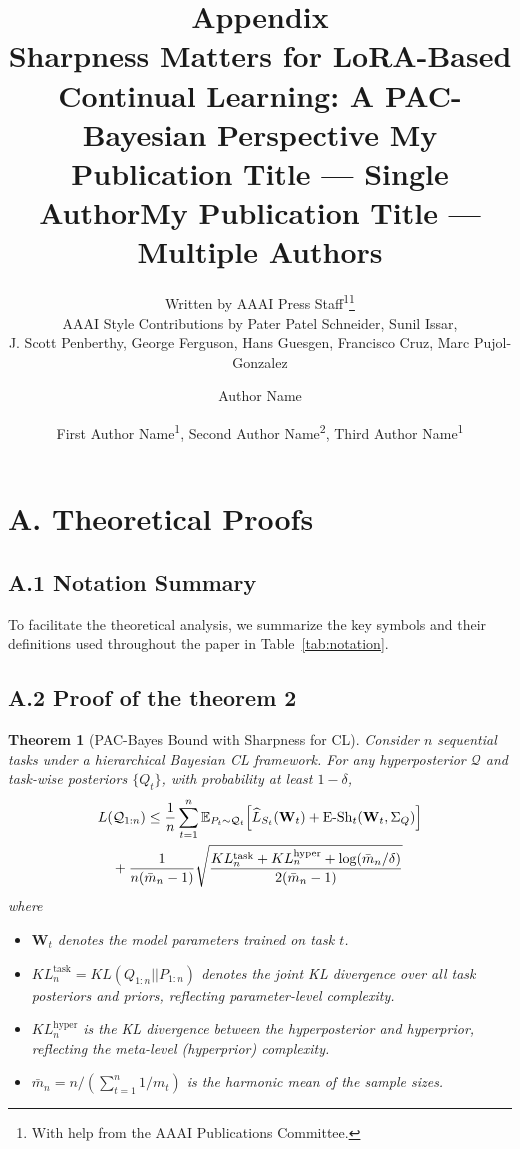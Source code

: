 \documentclass[letterpaper]{article} %
\title{Appendix \\ Sharpness Matters for LoRA-Based Continual Learning: A PAC-Bayesian Perspective }
\author{
    Written by AAAI Press Staff\textsuperscript{\rm 1}\thanks{With help from the AAAI Publications Committee.}\\
    AAAI Style Contributions by Pater Patel Schneider,
    Sunil Issar,\\
    J. Scott Penberthy,
    George Ferguson,
    Hans Guesgen,
    Francisco Cruz\equalcontrib,
    Marc Pujol-Gonzalez\equalcontrib
}
\title{My Publication Title --- Single Author}
\author {
    Author Name
}
\title{My Publication Title --- Multiple Authors}
\author {
    First Author Name\textsuperscript{\rm 1},
    Second Author Name\textsuperscript{\rm 2},
    Third Author Name\textsuperscript{\rm 1}
}
\newtheorem{theorem}{Theorem}
\begin{document}
\maketitle




\section{A. Theoretical Proofs}







\subsection{A.1 Notation Summary}
To facilitate the theoretical analysis, we summarize the key symbols and their definitions used throughout the paper in Table~\ref{tab:notation}.







\subsection{A.2 Proof of the theorem 2}

\begin{theorem}[PAC-Bayes Bound with Sharpness for CL]
\label{thm:general-pacbayes}
Consider $n$ sequential tasks under a hierarchical Bayesian CL framework. For any hyperposterior $\mathcal{Q}$ and task-wise posteriors $\{Q_t\}$, with probability at least $1-\delta$,
\begin{align}
& L(\mathcal{Q}_{1:n}) \leq \frac{1}{n} \sum_{t=1}^n \mathbb{E}_{P_{t} \sim \mathcal{Q}_{t}} \Big[ \widehat{L}_{S_t}(\mathbf{W}_t) 
+ {\mathrm{E\text{-}Sh}}_t(\mathbf{W}_t, \Sigma_Q) \Big] \notag\\
& \quad  +\frac{1}{n(\bar{m}_n-1)} \sqrt{
\frac{
KL^{\text{task}}_n + KL^{\text{hyper}}_n + \log(\bar{m}_n/\delta)
}{2(\bar{m}_n-1)}
}
\end{align}
where
\begin{itemize}
\item $\mathbf{W}_t$ denotes the model parameters trained on task $t$.
\item $KL^{\text{task}}_n = KL(Q_{1:n}||P_{1:n})$ denotes the joint KL divergence over all task posteriors and priors, reflecting parameter-level complexity.
\item $KL^{\text{hyper}}_n$ is the KL divergence between the hyperposterior and hyperprior, reflecting the meta-level (hyperprior) complexity. 
\item $\bar{m}_n = n / (\sum_{t=1}^n 1/m_t)$ is the harmonic mean of the sample sizes.
\end{itemize}
\end{theorem}
\end{document}
